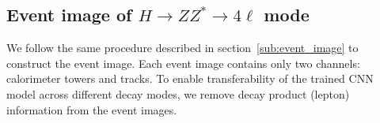 \documentclass[12pt]{article}
\begin{document}
        \begin{table}[htpb]
            \centering
            \caption{The number of events of mixed datasets under different selection cuts. Here, $agbq$ means that $n_g=a, n_q=b$.}
            \label{tab:number_of_event_in_mixed_dataset_gluon_jet_ZZ4l}
        \end{table}
    \subsection{Event image of \texorpdfstring{$H \to ZZ^* \to 4\ell$}{H to ZZ to 4l} mode}%
    \label{sub:event_image_of_h_to_zz_to_4l_mode}
        
        We follow the same procedure described in section~\ref{sub:event_image} to construct the event image. Each event image contains only two channels: calorimeter towers and tracks. To enable transferability of the trained CNN model across different decay modes, we remove decay product (lepton) information from the event images.
\end{document}
